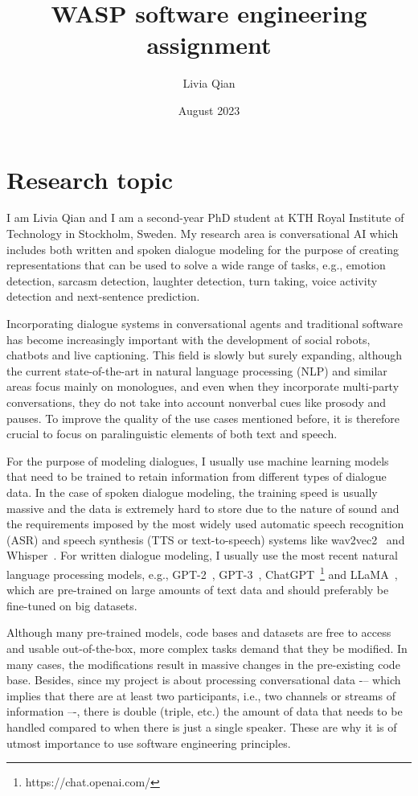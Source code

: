 \documentclass[11pt]{article}
\title{WASP software engineering assignment}
\author{Livia Qian}
\date{August 2023}
\begin{document}
\maketitle
\section{Research topic}

I am Livia Qian and I am a second-year PhD student at KTH Royal Institute of Technology in Stockholm, Sweden. My research area is conversational AI which includes both written and spoken dialogue modeling for the purpose of creating representations that can be used to solve a wide range of tasks, e.g., emotion detection, sarcasm detection, laughter detection, turn taking, voice activity detection and next-sentence prediction.

Incorporating dialogue systems in conversational agents and traditional software has become increasingly important with the development of social robots, chatbots and live captioning. This field is slowly but surely expanding, although the current state-of-the-art in natural language processing (NLP) and similar areas focus mainly on monologues, and even when they incorporate multi-party conversations, they do not take into account nonverbal cues like prosody and pauses. To improve the quality of the use cases mentioned before, it is therefore crucial to focus on paralinguistic elements of both text and speech.

For the purpose of modeling dialogues, I usually use machine learning models that need to be trained to retain information from different types of dialogue data. In the case of spoken dialogue modeling, the training speed is usually massive and the data is extremely hard to store due to the nature of sound and the requirements imposed by the most widely used automatic speech recognition (ASR) and speech synthesis (TTS or text-to-speech) systems like wav2vec2~\cite{wav2vec2} and Whisper~\cite{whisper}. For written dialogue modeling, I usually use the most recent natural language processing models, e.g., GPT-2~\cite{gpt2}, GPT-3~\cite{gpt3}, ChatGPT~\footnote{https://chat.openai.com/} and LLaMA~\cite{llama}, which are pre-trained on large amounts of text data and should preferably be fine-tuned on big datasets.

Although many pre-trained models, code bases and datasets are free to access and usable out-of-the-box, more complex tasks demand that they be modified. In many cases, the modifications result in massive changes in the pre-existing code base. Besides, since my project is about processing conversational data -– which implies that there are at least two participants, i.e., two channels or streams of information –-, there is double (triple, etc.) the amount of data that needs to be handled compared to when there is just a single speaker. These are why it is of utmost importance to use software engineering principles.
\end{document}
